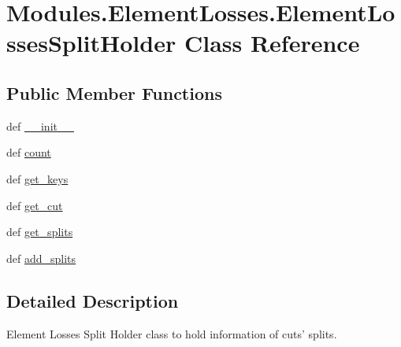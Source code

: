 \hypertarget{classModules_1_1ElementLosses_1_1ElementLossesSplitHolder}{\section{Modules.\-Element\-Losses.\-Element\-Losses\-Split\-Holder Class Reference}
\label{classModules_1_1ElementLosses_1_1ElementLossesSplitHolder}
}
\subsection*{Public Member Functions}
\begin{DoxyCompactItemize}
\item 
def \hyperlink{classModules_1_1ElementLosses_1_1ElementLossesSplitHolder_a10dece857ae109f5dd54e0c3b174d494}{\-\_\-\-\_\-init\-\_\-\-\_\-}
\item 
def \hyperlink{classModules_1_1ElementLosses_1_1ElementLossesSplitHolder_ad696a678a536b6b16a85e6a181df0853}{count}
\item 
def \hyperlink{classModules_1_1ElementLosses_1_1ElementLossesSplitHolder_a996005ee923a5c517529606092a0c069}{get\-\_\-keys}
\item 
def \hyperlink{classModules_1_1ElementLosses_1_1ElementLossesSplitHolder_ace7a9dfee09f35d6b5a73abe0a854b24}{get\-\_\-cut}
\item 
def \hyperlink{classModules_1_1ElementLosses_1_1ElementLossesSplitHolder_a6c07df9dce43b4dc06836d1643147d6d}{get\-\_\-splits}
\item 
def \hyperlink{classModules_1_1ElementLosses_1_1ElementLossesSplitHolder_af8c98d13c855b700f67d278ed6813cf3}{add\-\_\-splits}
\end{DoxyCompactItemize}


\subsection{Detailed Description}
\begin{DoxyVerb}Element Losses Split Holder class to hold information of cuts' splits.
\end{DoxyVerb}
 


